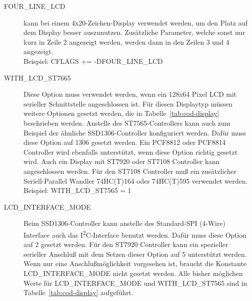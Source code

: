 \begin{description}
  \item[FOUR\_LINE\_LCD] kann bei einem 4x20-Zeichen-Display verwendet werden, um den Platz auf dem Display
besser auszunutzen. Zusätzliche Parameter, welche sonst nur kurz in Zeile 2 angezeigt werden, werden dann in
den Zeilen 3 und 4 angezeigt.\\
Beispiel: CFLAGS += -DFOUR\_LINE\_LCD

  \item[WITH\_LCD\_ST7665] Diese Option muss verwendet werden, wenn ein 128x64 Pixel LCD mit serieller
Schnittstelle angeschlossen ist. Für diesen Displaytyp müssen weitere Optionen gesetzt werden, die in Tabelle~\ref{tab:cod-display} 
beschrieben werden.
Anstelle des ST7565-Controllers kann auch zum Beispiel der ähnliche SSD1306-Controller konfiguriert werden.
Dafür muss diese Option auf 1306 gesetzt werden.
Ein PCF8812 oder PCF8814 Controller wird ebenfalls unterstützt, wenn diese Option richtig gesetzt wird.
Auch ein Display mit ST7920 oder ST7108 Controller kann angeschlossen werden.
Für den ST7108 Controller muß ein
zusätzlicher Seriell-Parallel Wandler 74HC(T)164 oder 74HC(T)595 verwendet werden.\\
Beispiel: WITH\_LCD\_ST7565 = 1 

 \item[LCD\_INTERFACE\_MODE] Beim SSD1306-Controller kann anstelle des Standard-SPI (4-Wire) Interface auch das
I\textsuperscript{2}C-Interface benutzt werden. Dafür muss diese Option auf 2 gesetzt werden.
Für den ST7920 Controller kann ein spezieller serieller Anschluß mit dem Setzen dieser Option auf 5
unterstützt werden.
Wenn nur eine Anschlußmöglichkeit vorgesehen ist, braucht die Konstante LCD\_INTERFACE\_MODE nicht gesetzt werden.
Alle bisher möglichen Werte für LCD\_INTERFACE\_MODE und WITH\_LCD\_ST7565 sind in Tabelle~\ref{tab:cod-display} aufgeführt.\\


\end{description}
